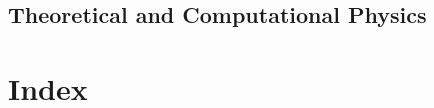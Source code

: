 \documentclass[11pt,a4paper,twoside,twocolumn]{article}
\begin{document}
\begin{bibunit}[hplain]

\putbib[combined]
\end{bibunit}


\subsection{Theoretical and Computational Physics}

%
%

\begin{bibunit}[hplain]

\putbib[combined]
\end{bibunit}

\begin{bibunit}[hplain]

\putbib[combined]
\end{bibunit}





%

\onecolumn


\section{Index} \printindex

\renewcommand{\bibsection}{\paragraph{\refname}\par}
\setlength{\bibhang}{0pt}

%
%
\end{document}

